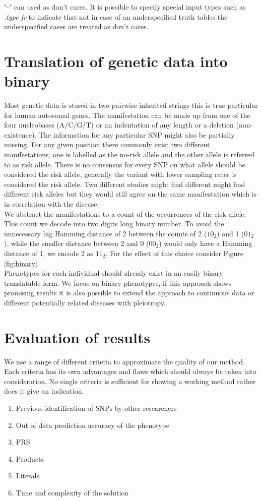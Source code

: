 \documentclass[letterpaper, 11pt]{article}
\begin{document}
"-" can used as don't cares. It is possible to specify special input types such as  \emph{.type fr} to indicate that not in case of an underspecified truth tables the underspecified cases are treated as don't cares. 


\section{Translation of genetic data into binary}
\label{sec:encode}
Most genetic data is stored in two pairwise inherited strings this is true particular for human autosomal genes. The manifestation can be made up from one of the four nucleobases (A/C/G/T) or an indentation of any length or a deletion (non-existence). The information for any particular SNP might also be partially missing. For any given position there commonly exist two different manifestations, one is labelled as the no-risk allele and the other allele is referred to as risk allele. There is no consensus for every SNP on what allele should be considered the risk allele, generally the variant with lower sampling rates is considered the risk allele. Two different studies might find different might find different risk alleles but they would still agree on the same manifestation which is in correlation with the disease. \\


We abstract the manifestations to a count of the occurrences of the risk allele. This count we decode into two digits long binary number. To avoid the unnecessary big Hamming distance of 2 between the counts of 2 ($10_2$) and 1 ($01_2$), while the smaller distance between 2 and 0 ($00_2$) would only have a Hamming distance of 1, we encode 2 as $11_2$. For the effect of this choice consider Figure \ref{fig:binary}.\\

Phenotypes for each individual should already exist in an easily binary translatable form.  We focus on binary phenotypes, if this approach shows promising results it is also possible to extend the approach to continuous  data or different potentially related diseases with pleiotropy. 

\section{Evaluation of results}
\label{sec:evaluate}
We use a range of different criteria to approximate the quality of our method. Each criteria has its own advantages and flaws which should always be taken into consideration. No single criteria is sufficient for showing a working method rather does it give an indication.
\begin{enumerate}
\item Previous identification of SNPs by other researchers
\item Out of data prediction accuracy of the phenotype
\item PRS 
\item Products 
\item Literals
\item Time and complexity of the solution\end{enumerate}
\end{document}
